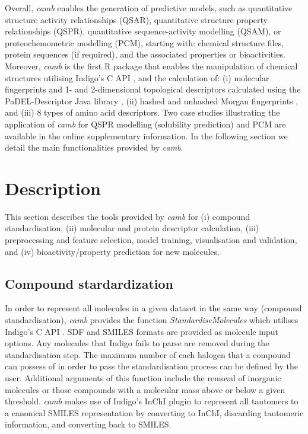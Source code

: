 \documentclass{bioinfo}
\begin{document}
Overall, {\it camb} enables the generation of predictive  models,
such as quantitative structure activity relationships (QSAR), 
quantitative structure property relationships (QSPR), 
quantitative sequence-activity modelling (QSAM), 
or proteochemometric modelling (PCM),
starting with: chemical structure files, protein sequences (if required), and the associated properties or bioactivities.
Moreover, {\it camb} is the first R package that enables the manipulation of chemical structures utilising Indigo's C API \citep{Indigo},
and the calculation of:
(i) molecular fingerprints and 1- and 2-dimensional topological descriptors calculated using the PaDEL-Descriptor Java library \citep{padel},
(ii) hashed and unhashed Morgan fingerprints \citep{extended_fp},
and (iii) 8 types of amino acid descriptors. 
Two case studies illustrating the application of {\it camb} for
QSPR modelling (solubility prediction) and PCM are available in the online supplementary information.
In the following section we detail the main functionalities provided by {\it camb}. 

\section{Description}
This section describes the tools provided by {\it camb} 
for (i) compound standardisation, (ii) molecular and protein descriptor calculation, 
(iii) preprocessing and feature selection, model training, visualisation and validation, and (iv) bioactivity/property prediction for new molecules.	

\subsection{Compound stardardization}

In order to represent all molecules in a given dataset in the same 
way (compound standardisation),
{\it camb}  provides the function {\it StandardiseMolecules} which utilises Indigo's C API \citep{Indigo}.
SDF and SMILES formats are provided as molecule input options. Any molecules that Indigo fails to parse are removed during the standardisation step.
The maximum number of each halogen that a compound can possess of in order to pass the standardisation process can be defined by the user.
Additional arguments of this function include the removal of inorganic molecules
or those compounds with a molecular mass above or below a given threshold.
{\it camb} makes use of Indigo's InChI \citep{inchi} plugin to represent all tautomers to a canonical SMILES representation
by converting to InChI, discarding tautomeric information, and converting back to SMILES.  
\end{document}
